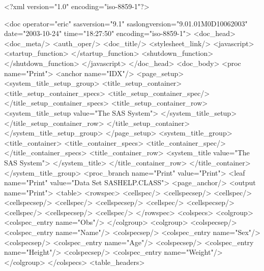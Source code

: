 \begin{sfvoutput}
<?xml version="1.0" encoding="iso-8859-1"?>

<doc operator="eric" sasversion="9.1" 
     saslongversion="9.01.01M0D10062003" 
     date="2003-10-24" time="18:27:50" encoding="iso-8859-1">
  <doc_head>
    <doc_meta/>
    <auth_oper/>
    <doc_title/>
    <stylesheet_link/>
    <javascript>
      <startup_function>
      </startup_function>
      <shutdown_function>
      </shutdown_function>
    </javascript>
  </doc_head>
  <doc_body>
    <proc name="Print">
      <anchor name="IDX"/>
      <page_setup>
        <system_title_setup_group>
          <title_setup_container>
            <title_setup_container_specs>
              <title_setup_container_spec/>
            </title_setup_container_specs>
            <title_setup_container_row>
              <system_title_setup value="The SAS System">
              </system_title_setup>
            </title_setup_container_row>
          </title_setup_container>
        </system_title_setup_group>
      </page_setup>
      <system_title_group>
        <title_container>
          <title_container_specs>
            <title_container_spec/>
          </title_container_specs>
          <title_container_row>
            <system_title value="The SAS System">
            </system_title>
          </title_container_row>
        </title_container>
      </system_title_group>
      <proc_branch name="Print" value="Print">
        <leaf name="Print" value="Data Set SASHELP.CLASS">
          <page_anchor/>
          <output name="Print">
            <table>
              <rowspec>
                <cellspec/>
                <cellspecsep/>
                <cellspec/>
                <cellspecsep/>
                <cellspec/>
                <cellspecsep/>
                <cellspec/>
                <cellspecsep/>
                <cellspec/>
                <cellspecsep/>
                <cellspec/>
              </rowspec>
              <colspecs>
                <colgroup>
                  <colspec_entry name="Obs"/>
                </colgroup>
                <colgroup>
                  <colspecsep/>
                  <colspec_entry name="Name"/>
                  <colspecsep/>
                  <colspec_entry name="Sex"/>
                  <colspecsep/>
                  <colspec_entry name="Age"/>
                  <colspecsep/>
                  <colspec_entry name="Height"/>
                  <colspecsep/>
                  <colspec_entry name="Weight"/>
                </colgroup>
              </colspecs>
              <table_headers>

\end{sfvoutput}
